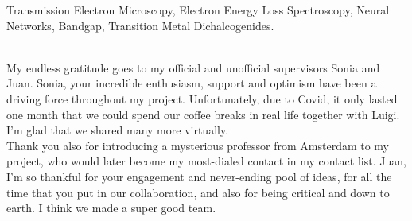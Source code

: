 \documentclass[12pt,a4paper]{article}
\numberwithin{equation}{section}
\numberwithin{figure}{section}
\numberwithin{table}{section}
\begin{document}
\vspace{0.6cm}
 {\small Transmission Electron Microscopy,
Electron Energy Loss Spectroscopy, Neural Networks, Bandgap, Transition
Metal Dichalcogenides.}\\



\clearpage
\tableofcontents
\newpage


\newpage


\newpage


\newpage


\newpage


\newpage


\newpage


\newpage



\appendix

\newpage


\newpage

\\[1.0cm]

\noindent My endless gratitude goes to my official and unofficial supervisors
Sonia and Juan.
%
Sonia, your incredible enthusiasm, support and optimism
have been a driving force throughout my project.
%
Unfortunately, due to Covid, it only lasted one month that
we could spend our coffee breaks 
in real life together with Luigi. 
%
I'm glad that we shared many more virtually.\\

\noindent Thank you also for introducing a mysterious professor from 
Amsterdam to my project, who would later become 
my most-dialed contact in my contact list.
%
Juan, I'm so thankful for your engagement and 
never-ending pool of ideas, for all the time that you put
in our collaboration, and also for being critical and
down to earth. 
%
I think we made a super good team.\\
\end{document}
